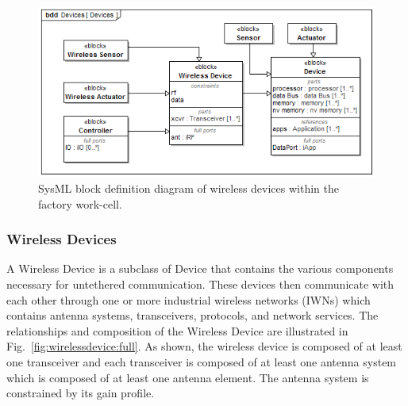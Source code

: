 \documentclass[journal, twoside]{IEEEtran}
\begin{document}
	\begin{figure}[H]
		\centering
		\includegraphics[width=\columnwidth]{diagrams/bdd__Devices__Devices}%
		\caption{SysML block definition diagram of wireless devices within the factory work-cell.}%
        \label{fig:bdd:devices}
	\end{figure}
	
	
	
	\subsubsection{Wireless Devices}\label{sec:devices:wireless-device} 
	A Wireless Device is a subclass of Device that contains the various components necessary for untethered communication.  These devices then communicate with each other through one or more industrial wireless networks (IWNs) which contains antenna systems, transceivers, protocols, and network services.  The relationships and composition of the Wireless Device are illustrated in Fig.~\ref{fig:wirelessdevice:full}. As shown, the wireless device is composed of at least one transceiver and each transceiver is composed of at least one antenna system which is composed of at least one antenna element.  The antenna system is constrained by its gain profile.
	
\end{document}
